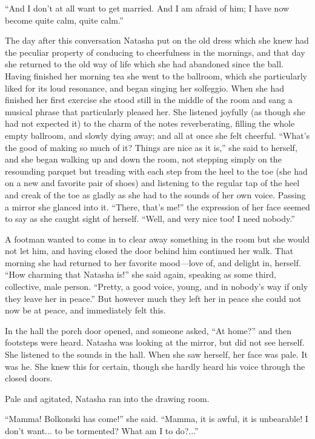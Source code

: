 ``And I don't at all want to get married. And I am afraid of him;
I have now become quite calm, quite calm.''

The day after this conversation Natasha put on the old dress
which she knew had the peculiar property of conducing to
cheerfulness in the mornings, and that day she returned to the
old way of life which she had abandoned since the ball. Having
finished her morning tea she went to the ballroom, which she
particularly liked for its loud resonance, and began singing her
solfeggio. When she had finished her first exercise she stood
still in the middle of the room and sang a musical phrase that
particularly pleased her. She listened joyfully (as though she
had not expected it) to the charm of the notes reverberating,
filling the whole empty ballroom, and slowly dying away; and all
at once she felt cheerful. ``What's the good of making so much of
it? Things are nice as it is,'' she said to herself, and she
began walking up and down the room, not stepping simply on the
resounding parquet but treading with each step from the heel to
the toe (she had on a new and favorite pair of shoes) and
listening to the regular tap of the heel and creak of the toe as
gladly as she had to the sounds of her own voice. Passing a
mirror she glanced into it. ``There, that's me!'' the expression
of her face seemed to say as she caught sight of herself. ``Well,
and very nice too!  I need nobody.''

A footman wanted to come in to clear away something in the room
but she would not let him, and having closed the door behind him
continued her walk. That morning she had returned to her favorite
mood---love of, and delight in, herself. ``How charming that
Natasha is!'' she said again, speaking as some third, collective,
male person. ``Pretty, a good voice, young, and in nobody's way
if only they leave her in peace.'' But however much they left her
in peace she could not now be at peace, and immediately felt
this.

In the hall the porch door opened, and someone asked, ``At
home?'' and then footsteps were heard. Natasha was looking at the
mirror, but did not see herself. She listened to the sounds in
the hall. When she saw herself, her face was pale. It was he. She
knew this for certain, though she hardly heard his voice through
the closed doors.

Pale and agitated, Natasha ran into the drawing room.

``Mamma! Bolkonski has come!'' she said. ``Mamma, it is awful, it
is unbearable! I don't want... to be tormented? What am I to
do?...''

